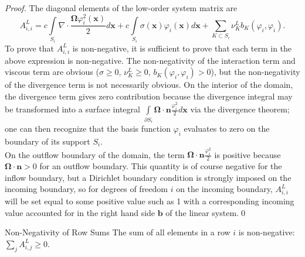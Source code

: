 \begin{proof}
The diagonal elements of the low-order system matrix are
\[
	A^L_{i,i} = c\int\limits_{S_{i}}\nabla\cdot
   \frac{\mathbf{\Omega}\varphi_i^2(\mathbf{x})}{2} d\mathbf{x} 
      + c\int\limits_{S_{i}}\sigma(\mathbf{x})\varphi_i(\mathbf{x})d\mathbf{x} +
		\sum\limits_{K\subset S_{i}}\nu_K^L b_K(\varphi_i, \varphi_i).
\]
To prove that $A^L_{i,i}$ is non-negative, it is sufficient to prove that
each term in the above expression is non-negative. The non-negativity of
the interaction term and viscous term are obvious ($\sigma \ge 0, 
\, \nu_K^L\ge 0, \, b_K(\varphi_i, \varphi_i)>0$), but
the non-negativity of the divergence term is not necessarily obvious. On the interior of
the domain, the divergence term gives zero contribution because the divergence integral may
be transformed into a surface integral $\int\limits_{\partial S_{i}}
\mathbf{\Omega}\cdot\mathbf{n}\frac{\varphi_i^2}{2} d\mathbf{x}$
via the divergence theorem; one can then recognize that
the basis function $\varphi_i$ evaluates to zero on the boundary of its support $S_{i}$.\\
On the outflow boundary of the domain, the term $\mathbf{\Omega}\cdot\mathbf{n}
\frac{\varphi_i^2}{2}$ is positive because $\mathbf{\Omega}\cdot\mathbf{n} >0$
for an outflow boundary. This quantity is of course negative for the inflow boundary,
but a Dirichlet boundary condition is strongly imposed on the incoming boundary, so
for degrees of freedom $i$ on the incoming boundary, $A^L_{i,i}$ will be set equal
to some positive value such as 1 with a corresponding incoming value
accounted for in the right hand side $\mathbf{b}$ of the linear system.\qed
\end{proof}
\begin{lemma}{Non-Negativity of Row Sums}
   The sum of all elements in a row $i$ is non-negative: $\sum\limits_j A^L_{i,j} \ge 0$.
\end{lemma}

